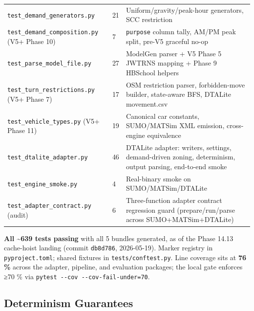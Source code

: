 \begin{longtable}[]{@{}lll@{}}
\texttt{test\_demand\_generators.py} & 21 & Uniform/gravity/peak-hour
generators, SCC restriction \\
\texttt{test\_demand\_composition.py} (V5+ Phase 10) & 7 &
\texttt{purpose} column tally, AM/PM peak split, pre-V5 graceful
no-op \\
\texttt{test\_parse\_model\_file.py} & 27 & ModelGen parser + V5 Phase 5
JWTRNS mapping + Phase 9 HBSchool helpers \\
\texttt{test\_turn\_restrictions.py} (V5+ Phase 7) & 17 & OSM
restriction parser, forbidden-move builder, state-aware BFS, DTALite
movement.csv \\
\texttt{test\_vehicle\_types.py} (V5+ Phase 11) & 19 & Canonical car
constants, SUMO/MATSim XML emission, cross-engine equivalence \\
\texttt{test\_dtalite\_adapter.py} & 46 & DTALite adapter: writers,
settings, demand-driven zoning, determinism, output parsing, end-to-end
smoke \\
\texttt{test\_engine\_smoke.py} & 4 & Real-binary smoke on
SUMO/MATSim/DTALite \\
\texttt{test\_adapter\_contract.py} (audit) & 6 & Three-function adapter
contract regression guard (prepare/run/parse across
SUMO+MATSim+DTALite) \\
\end{longtable}

\textbf{All \textasciitilde639 tests passing} with all 5 bundles
generated, as of the Phase 14.13 cache-hoist landing (commit
\texttt{db8d786}, 2026-05-19). Marker registry in
\texttt{pyproject.toml}; shared fixtures in \texttt{tests/conftest.py}.
Line coverage sits at \textbf{76 \%} across the adapter, pipeline, and
evaluation packages; the local gate enforces ≥70 \% via
\texttt{pytest\ -\/-cov\ -\/-cov-fail-under=70}.

\subsection{Determinism
Guarantees}\label{372-determinism-guarantees}

